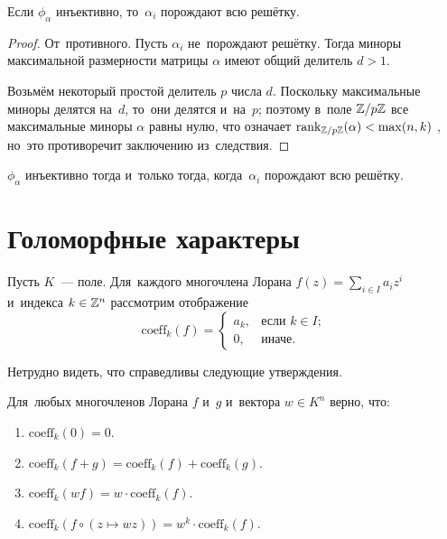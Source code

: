 \documentclass[a4paper,oneside]{article}
\begin{document}
\begin{lemma*}
    Если $\phi_\alpha$ инъективно, то~$\alpha_i$ порождают всю решётку.
\end{lemma*}

\begin{proof}
    От~противного. Пусть $\alpha_i$ не~порождают решётку. Тогда миноры максимальной размерности
    матрицы $\alpha$ имеют общий делитель $d > 1$.

    Возьмём некоторый простой делитель $p$ числа $d$. Поскольку максимальные миноры
    делятся на~$d$, то~они делятся и~на~$p$; поэтому в~поле $\mathbb{Z} / p \mathbb{Z}$
    все максимальные миноры $\alpha$ равны нулю, что означает $\mathrm{rank}_{\mathbb{Z} / p \mathbb{Z}}(\alpha) < \max(n, k)$ \cite{Brbk70},
    но~это противоречит заключению из~следствия.
\end{proof}

\begin{consequence*}
    $\phi_\alpha$ инъективно тогда и~только тогда, когда~$\alpha_i$ порождают всю решётку.
\end{consequence*}

\section{Голоморфные характеры}

Пусть $K$~— поле. Для~каждого многочлена Лорана $f(z) = \sum_{i \in I} a_i z^i$ и~индекса $k \in \mathbb{Z}^n$ рассмотрим отображение
$$
    \mathrm{coeff}_k(f) =
    \begin{cases}
        a_k, & \text{если $k \in I$}; \\
        0,   & \text{иначе.}
    \end{cases}
$$

Нетрудно видеть, что справедливы следующие утверждения.
\begin{lemma*}
    Для~любых многочленов Лорана $f$ и~$g$ и~вектора $w \in K^n$ верно, что:
    \begin{enumerate}
        \item $\mathrm{coeff}_k(0) = 0$.
        \item $\mathrm{coeff}_k(f + g) = \mathrm{coeff}_k(f) + \mathrm{coeff}_k(g)$.
        \item $\mathrm{coeff}_k(w f) = w \cdot \mathrm{coeff}_k(f)$.
        \item $\mathrm{coeff}_k(f \circ (z \mapsto wz)) = w^k \cdot \mathrm{coeff}_k(f)$.
    \end{enumerate}
\end{lemma*}
\end{document}
